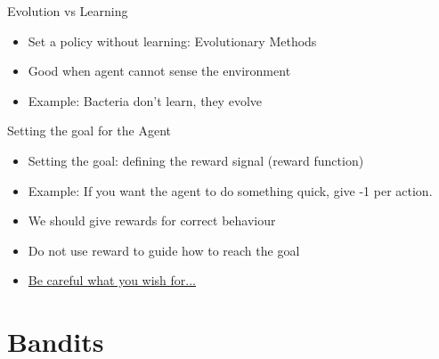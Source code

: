 \documentclass[10pt]{beamer}
\begin{document}
\begin{frame}{Evolution vs Learning}

\begin{itemize}
\item Set a policy without learning: {\color{uured} Evolutionary} Methods
\item Good when agent cannot sense the environment\pause
\item {\color{uured} Example}: Bacteria don't learn, they evolve
\end{itemize}

\end{frame}


\begin{frame}{Setting the goal for the Agent}

\begin{itemize}
\item Setting the goal: {\color{uured} defining the reward} signal (reward function)
\item {\color{uured} Example}: If you want the agent to do something quick, give -1 per action.\pause
\item We should give rewards for correct {\color{uured} behaviour}
\item Do {\color{uured} not} use reward to guide {\color{uured} how} to reach the goal
\item \href{https://openai.com/blog/faulty-reward-functions/}{{\color{blue} Be careful what you wish for...}}
\end{itemize}

\end{frame}


\section{Bandits}
\frame{\sectionpage}
\end{document}
